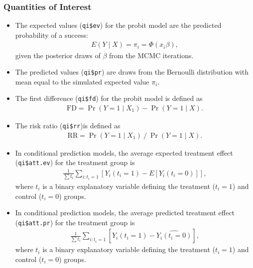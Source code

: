 \subsubsection{Quantities of Interest}

\begin{itemize}
\item The expected values (\texttt{qi\$ev}) for the probit model are
the predicted probability of a success:
\begin{eqnarray*}
E(Y \mid X) = \pi_{i}= \Phi(x_i \beta),
\end{eqnarray*}
given the posterior draws of $\beta$ from the MCMC iterations.

\item The predicted values (\texttt{qi\$pr}) are draws from the Bernoulli
distribution with mean equal to the simulated expected value $\pi_{i}$.

\item The first difference (\texttt{qi\$fd}) for the probit model is defined
as
\begin{eqnarray*}
\text{FD}=\Pr(Y=1\mid X_{1})-\Pr(Y=1\mid X).
\end{eqnarray*}

\item The risk ratio (\texttt{qi\$rr})is defined as
\begin{eqnarray*}
\text{RR}=\Pr(Y=1\mid X_{1})\ /\ \Pr(Y=1\mid X).
\end{eqnarray*}

\item In conditional prediction models, the average expected treatment effect
(\texttt{qi\$att.ev}) for the treatment group is
\begin{eqnarray*}
\frac{1}{\sum t_{i}}\sum_{i:t_{i}=1}[Y_{i}(t_{i}=1)-E[Y_{i}(t_{i}=0)]],
\end{eqnarray*}
where $t_{i}$ is a binary explanatory variable defining the treatment
($t_{i}=1$) and control ($t_{i}=0$) groups. 

\item In conditional prediction models, the average predicted treatment effect
(\texttt{qi\$att.pr}) for the treatment group is
\begin{eqnarray*}
\frac{1}{\sum t_{i}}\sum_{i:t_{i}=1}[Y_{i}(t_{i}=1)-\widehat{Y_{i}(t_{i}=0)}],
\end{eqnarray*}
where $t_{i}$ is a binary explanatory variable defining the treatment
($t_{i}=1$) and control ($t_{i}=0$) groups. 
\end{itemize}

